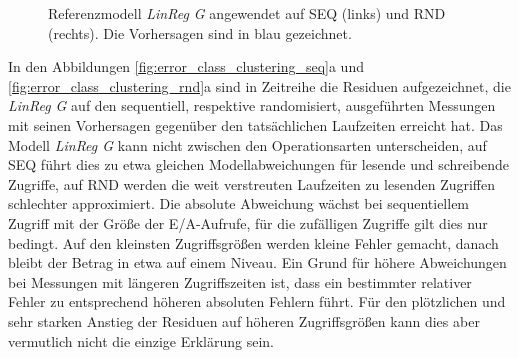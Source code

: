 \documentclass[
	12pt,
	a4paper,
	BCOR10mm,
	DIV14,
	listof=totoc,
	bibliography=totoc,
	headsepline
]{scrreprt}
\begin{document}
\begin{figure}[!b]
	\centering
	\hfill
	\caption{Referenzmodell \textit{LinReg G} angewendet auf SEQ (links) und RND (rechts). Die Vorhersagen sind in blau gezeichnet.}
	\label{fig:vorgriff_linreg}
\end{figure} 

In den Abbildungen \ref{fig:error_class_clustering_seq}a und \ref{fig:error_class_clustering_rnd}a sind in Zeitreihe die Residuen aufgezeichnet, die \textit{LinReg G} auf den sequentiell, respektive randomisiert, ausgeführten Messungen mit seinen Vorhersagen gegenüber den tatsächlichen Laufzeiten erreicht hat.
Das Modell \textit{LinReg G} kann nicht zwischen den Operationsarten unterscheiden, auf SEQ führt dies zu etwa gleichen Modellabweichungen für lesende und schreibende Zugriffe, auf RND werden die weit verstreuten Laufzeiten zu lesenden Zugriffen schlechter approximiert.
Die absolute Abweichung wächst bei sequentiellem Zugriff mit der Größe der E/A-Aufrufe, für die zufälligen Zugriffe gilt dies nur bedingt. Auf den kleinsten Zugriffsgrößen werden kleine Fehler gemacht, danach bleibt der Betrag in etwa auf einem Niveau.
Ein Grund für höhere Abweichungen bei Messungen mit längeren Zugriffszeiten ist, dass ein bestimmter relativer Fehler zu entsprechend höheren absoluten Fehlern führt.
Für den plötzlichen und sehr starken Anstieg der Residuen auf höheren Zugriffsgrößen kann dies aber vermutlich nicht die einzige Erklärung sein.
\end{document}
